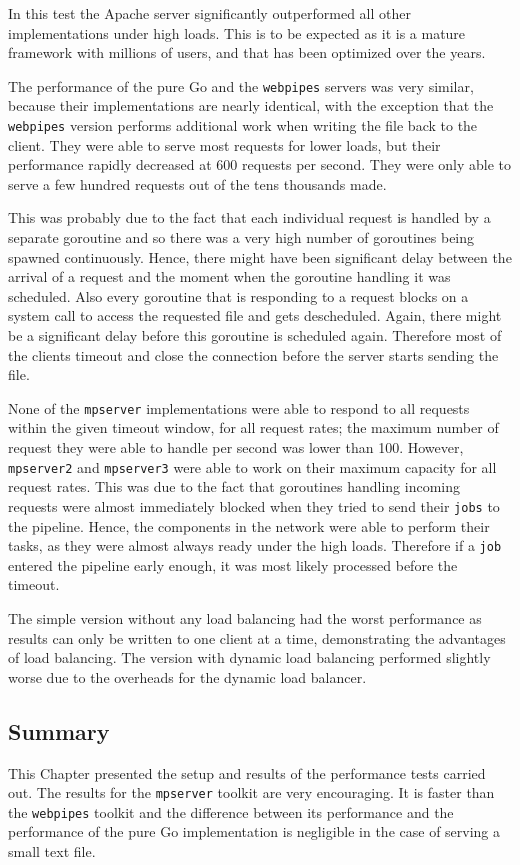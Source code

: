 In this test the Apache server significantly outperformed all other implementations under 
high loads. This is to be expected as it is a mature framework with millions of users, and that has 
been optimized over the years.

The performance of the pure Go and the \texttt{webpipes} servers was very similar, because their implementations are nearly identical, with the exception
that the \texttt{webpipes} version performs additional work when writing the file back to 
the client. They were able to serve most requests for lower loads, but their performance
rapidly decreased at 600 requests per second. They were only able to serve a few hundred requests
out of the tens thousands made. 

This was probably due to the fact that each individual request is handled by a 
separate goroutine and so there was a very high number of goroutines being spawned
continuously. Hence, there might have been significant delay between the arrival of 
a request and the moment when the goroutine handling it was scheduled. 
Also every goroutine that is responding to a request blocks on a system call to 
access the requested file and gets descheduled. Again, there might be a significant
delay before this goroutine is scheduled again. Therefore most of the clients 
timeout and close the connection before the server starts sending the file.

None of the \texttt{mpserver} implementations were able to respond to all requests 
within the given timeout window, for all request rates; the maximum number 
of request they were able to handle per second was lower than 100. 
However, \texttt{mpserver2} and \texttt{mpserver3} were able to work on their maximum 
capacity for all request rates. This was due to 
the fact that goroutines handling incoming requests were almost immediately blocked
when they tried to send their \texttt{jobs} to the pipeline. Hence, the components 
in the network were able to perform their tasks, as they were almost always ready 
under the high loads. Therefore if a \texttt{job} entered the pipeline early enough,
it was most likely processed before the timeout.

The simple version without any load balancing had the worst performance as results 
can only be written to one client at a time, demonstrating the advantages of 
load balancing. The version with dynamic load balancing performed slightly worse due
to the overheads for the dynamic load balancer.

\subsection{Summary}
This Chapter presented the setup and results of the performance tests carried out.
The results for the \texttt{mpserver} toolkit are very encouraging. It is faster than
the \texttt{webpipes} toolkit and the difference between its performance and the performance
of the pure Go implementation is negligible in the case of serving a small text file.

